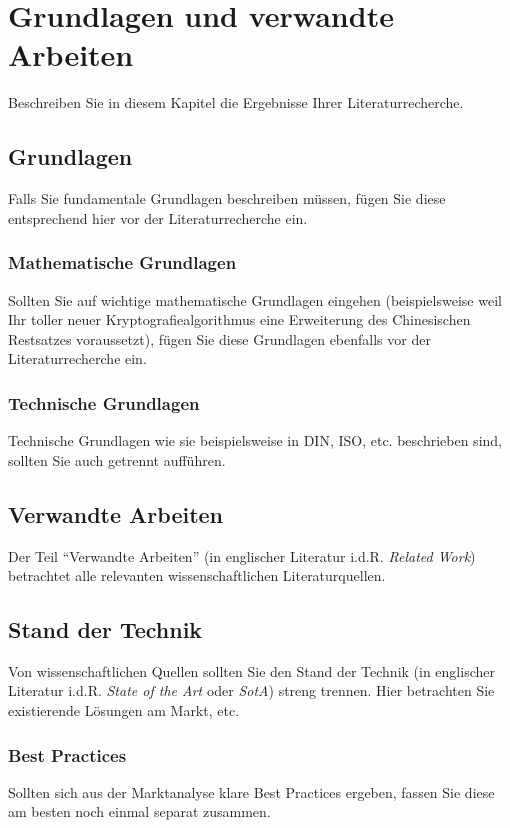 \chapter{Grundlagen und verwandte Arbeiten}\label{chap:RelatedWork}
Beschreiben Sie in diesem Kapitel die Ergebnisse Ihrer Literaturrecherche.

\section{Grundlagen}\label{sec:RelatedWork:Foundations}
Falls Sie fundamentale Grundlagen beschreiben müssen, fügen Sie diese entsprechend hier vor der Literaturrecherche ein.

\subsection{Mathematische Grundlagen}\label{subsec:RelatedWork:Foundations:Maths}
Sollten Sie auf wichtige mathematische Grundlagen eingehen (beispielsweise weil Ihr toller neuer Kryptografiealgorithmus eine Erweiterung des Chinesischen Restsatzes voraussetzt), fügen Sie diese Grundlagen ebenfalls vor der Literaturrecherche ein.

\subsection{Technische Grundlagen}\label{subsec:RelatedWork:Foundations:Techs}
Technische Grundlagen wie sie beispielsweise in DIN, ISO, etc. beschrieben sind, sollten Sie auch getrennt aufführen.

\section{Verwandte Arbeiten}\label{sec:RelatedWork:Publications}
Der Teil \enquote{Verwandte Arbeiten} (in englischer Literatur i.d.R. \emph{Related Work}) betrachtet alle relevanten wissenschaftlichen Literaturquellen.

\section{Stand der Technik}\label{sec:RelatedWork:SotA}
Von wissenschaftlichen Quellen sollten Sie den Stand der Technik (in englischer Literatur i.d.R. \emph{State of the Art} oder \emph{SotA}) streng trennen. Hier betrachten Sie existierende Lösungen am Markt, etc.

\subsection{Best Practices}\label{subsec:RelatedWork:BestPractices}
Sollten sich aus der Marktanalyse klare Best Practices ergeben, fassen Sie diese am besten noch einmal separat zusammen.